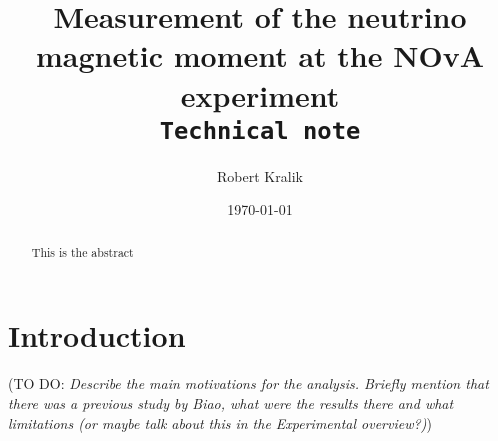 \documentclass[12pt]{article}
\title{Measurement of the neutrino magnetic moment at the NOvA experiment\\ \vspace*{1cm} \texttt{Technical note}}
\author[1]{Robert Kralik}
\affil[1]{University of Sussex, Brighton, UK}
\date{\today}
\newcommand{\todo }[1]{({\color{red}\sc TO DO: \textit{#1}})}
\begin{document}
\maketitle

\begin{abstract}
    This is the abstract
\end{abstract}
\newpage
\tableofcontents
\newpage

\section{Introduction}

\todo{Describe the main motivations for the analysis. Briefly mention that there was a previous study by Biao, what were the results there and what limitations (or maybe talk about this in the Experimental overview?)}


\end{document}
